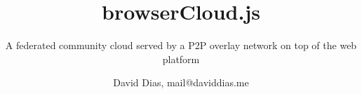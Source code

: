 \documentclass[9.5pt,twocolumn]{./llncs2e/llncs}
\begin{document}
\title{browserCloud.js}

\subtitle{A federated community cloud served by a P2P overlay network on top of the web platform}
\author{David Dias, mail@daviddias.me
}



\maketitle












%
%
\tiny


\end{document}
